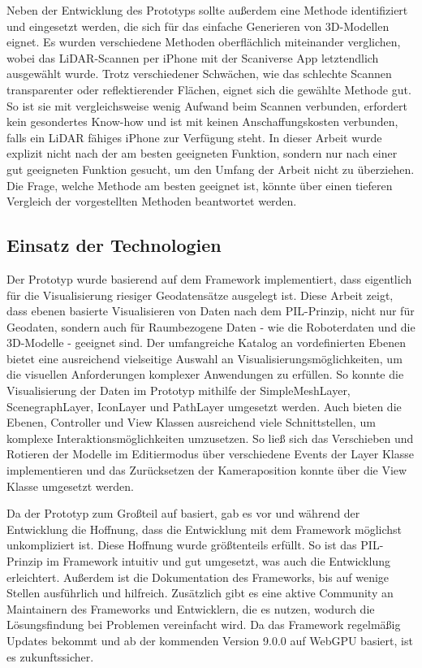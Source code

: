 Neben der Entwicklung des Prototyps sollte außerdem eine Methode identifiziert und eingesetzt werden, die sich für das einfache Generieren von 3D-Modellen eignet. Es wurden verschiedene Methoden oberflächlich miteinander verglichen, wobei das \ac{LiDAR}-Scannen per iPhone mit der Scaniverse App letztendlich ausgewählt wurde. Trotz verschiedener Schwächen, wie das schlechte Scannen transparenter oder reflektierender Flächen, eignet sich die gewählte Methode gut. So ist sie mit vergleichsweise wenig Aufwand beim Scannen verbunden, erfordert kein gesondertes Know-how und ist mit keinen Anschaffungskosten verbunden, falls ein \ac{LiDAR} fähiges iPhone zur Verfügung steht. In dieser Arbeit wurde explizit nicht nach der am besten geeigneten Funktion, sondern nur nach einer gut geeigneten Funktion gesucht, um den Umfang der Arbeit nicht zu überziehen. Die Frage, welche Methode am besten geeignet ist, könnte über einen tieferen Vergleich der vorgestellten Methoden beantwortet werden.

\subsection{Einsatz der Technologien}
Der Prototyp wurde basierend auf dem Framework \deckgl{} implementiert, dass eigentlich für die Visualisierung riesiger Geodatensätze ausgelegt ist. Diese Arbeit zeigt, dass ebenen basierte Visualisieren von Daten nach dem \ac{PIL}-Prinzip, nicht nur für Geodaten, sondern auch für Raumbezogene Daten - wie die Roboterdaten und die 3D-Modelle - geeignet sind. Der umfangreiche Katalog an vordefinierten Ebenen bietet eine ausreichend vielseitige Auswahl an Visualisierungsmöglichkeiten, um die visuellen Anforderungen komplexer Anwendungen zu erfüllen. So konnte die Visualisierung der Daten im Prototyp mithilfe der SimpleMeshLayer, ScenegraphLayer, IconLayer und PathLayer umgesetzt werden. Auch bieten die Ebenen, Controller und View Klassen ausreichend viele Schnittstellen, um komplexe Interaktionsmöglichkeiten umzusetzen. So ließ sich das Verschieben und Rotieren der Modelle im Editiermodus über verschiedene Events der Layer Klasse implementieren und das Zurücksetzen der Kameraposition konnte über die View Klasse umgesetzt werden.

Da der Prototyp zum Großteil auf \deckgl{} basiert, gab es vor und während der Entwicklung die Hoffnung, dass die Entwicklung mit dem Framework möglichst unkompliziert ist. Diese Hoffnung wurde größtenteils erfüllt. So ist das \ac{PIL}-Prinzip im Framework intuitiv und gut umgesetzt, was auch die Entwicklung erleichtert. Außerdem ist die Dokumentation des Frameworks, bis auf wenige Stellen ausführlich und hilfreich. Zusätzlich gibt es eine aktive Community an Maintainern des Frameworks und Entwicklern, die es nutzen, wodurch die Lösungsfindung bei Problemen vereinfacht wird. Da das Framework regelmäßig Updates bekommt und ab der kommenden Version 9.0.0 auf WebGPU basiert, ist es zukunftssicher.

